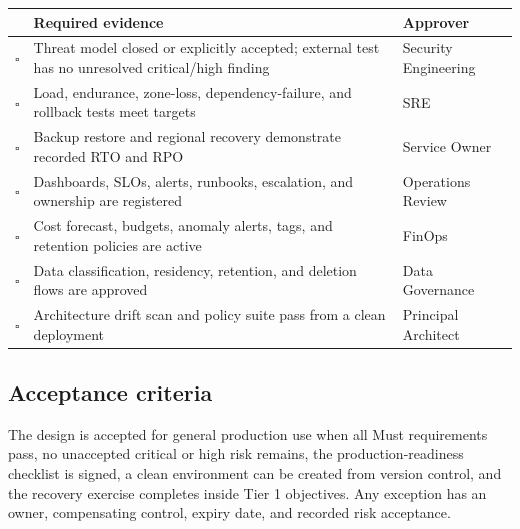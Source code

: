 \begin{tabularx}{\textwidth}{@{}C{10mm}Y L{38mm}@{}}
  \toprule
  \color{white}\textbf{} & \color{white}\textbf{Required evidence} & \color{white}\textbf{Approver} \\
  \midrule
  $\square$ & Threat model closed or explicitly accepted; external test has no unresolved critical/high finding & Security Engineering \\
  $\square$ & Load, endurance, zone-loss, dependency-failure, and rollback tests meet targets & SRE \\
  $\square$ & Backup restore and regional recovery demonstrate recorded RTO and RPO & Service Owner \\
  $\square$ & Dashboards, SLOs, alerts, runbooks, escalation, and ownership are registered & Operations Review \\
  $\square$ & Cost forecast, budgets, anomaly alerts, tags, and retention policies are active & FinOps \\
  $\square$ & Data classification, residency, retention, and deletion flows are approved & Data Governance \\
  $\square$ & Architecture drift scan and policy suite pass from a clean deployment & Principal Architect \\
  \bottomrule
\end{tabularx}

\subsection{Acceptance criteria}

The design is accepted for general production use when all Must requirements pass, no unaccepted critical or high risk remains, the production-readiness checklist is signed, a clean environment can be created from version control, and the recovery exercise completes inside Tier 1 objectives. Any exception has an owner, compensating control, expiry date, and recorded risk acceptance.

\appendix
